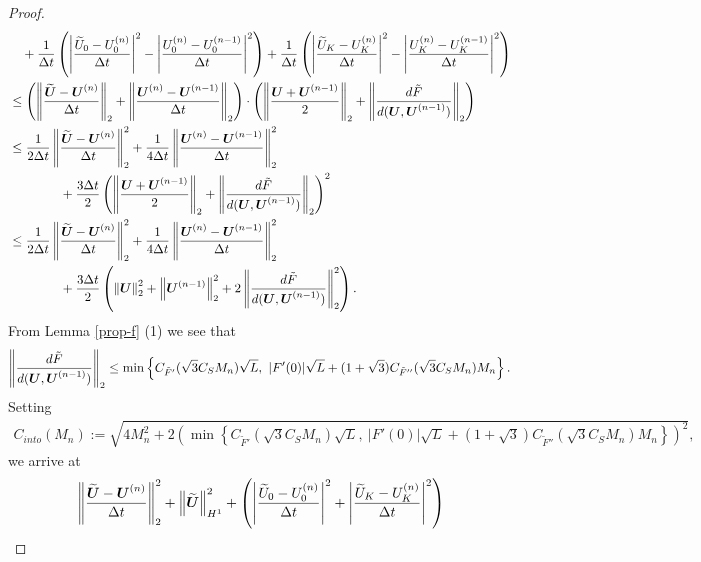 \documentclass[dvipdfmx-if-dvi,autodetect-engine,ja=standard]{amsart}
\numberwithin{equation}{section} %
\def\vect#1{\mbox{\boldmath $#1$}} %
\begin{document}
\begin{proof}
\begin{align*}
&\quad + \frac{1}{\Delta t}\left( \left| \frac{\widetilde{U}_0 - U_0^{(n)}}{\Delta t} \right|^2 - \left| \frac{U_0^{(n)} - U_0^{(n-1)}}{\Delta t} \right|^2 \right)
+ \frac{1}{\Delta t}\left( \left| \frac{\widetilde{U}_K - U_K^{(n)}}{\Delta t} \right|^2 - \left| \frac{U_K^{(n)} - U_K^{(n-1)}}{\Delta t} \right|^2 \right) \\
&\leq \left( \left\| \frac{\widetilde{\vect{U}} -\vect{U}^{(n)}}{\Delta t} \right\|_2 + \left\| \frac{\vect{U}^{(n)} -\vect{U}^{(n-1)}}{\Delta t} \right\|_2 \right) \cdot \left( \left\| \frac{\vect{U} + \vect{U}^{(n-1)}}{2} \right\|_2 + \left\|   \frac{d \tilde{F}}{d(\vect{U}, \vect{U}^{(n-1)})} \right\|_2 \right) \\
&\leq \frac{1}{2\Delta t} \left\| \frac{\widetilde{\vect{U}} -\vect{U}^{(n)}}{\Delta t} \right\|_2^2 
    + \frac{1}{4\Delta t} \left\| \frac{\vect{U}^{(n)} -\vect{U}^{(n-1)}}{\Delta t} \right\|_2^2 \\
&\qquad \qquad    + \frac{3 \Delta t}{2}\left( \left\| \frac{\vect{U} + \vect{U}^{(n-1)}}{2} \right\|_2 + \left\|   \frac{d \tilde{F}}{d(\vect{U}, \vect{U}^{(n-1)})} \right\|_2 \right)^2 \\
&\leq \frac{1}{2\Delta t} \left\| \frac{\widetilde{\vect{U}} -\vect{U}^{(n)}}{\Delta t} \right\|_2^2 
    + \frac{1}{4\Delta t} \left\| \frac{\vect{U}^{(n)} -\vect{U}^{(n-1)}}{\Delta t} \right\|_2^2 \\
&\qquad \qquad    + \frac{3 \Delta t}{2}\left( \left\| \vect{U}  \right\|_2^2 + \left\|  \vect{U}^{(n-1)} \right\|_2^2 + 2 \left\|  \frac{d \tilde{F}}{d(\vect{U}, \vect{U}^{(n-1)})} \right\|_2^2 \right).
\end{align*}
From Lemma \ref{prop-f} (1) we see that
\begin{align*}
\left\|  \frac{d \tilde{F}}{d(\vect{U}, \vect{U}^{(n-1)})} \right\|_2 \leq \min \left\{  C_{\tilde{F}'}(\sqrt{3} C_S M_n) \sqrt{L}, \  |F'(0)| \sqrt{L} + (1+\sqrt{3}) C_{\tilde{F}''}(\sqrt{3} C_S M_n) M_n \right\}. 
\end{align*}
Setting
\begin{align*}
C_{into}(M_n) := \sqrt{4 M_n^2 + 
2 \left(\min \left\{  C_{\tilde{F}'}(\sqrt{3} C_S M_n) \sqrt{L}, \  |F'(0)| \sqrt{L} + (1+\sqrt{3}) C_{\tilde{F}''}(\sqrt{3} C_S M_n) M_n \right\} \right)^2 },
\end{align*}
we arrive at  
\begin{align*}
&\left\| \frac{\widetilde{\vect{U}} -\vect{U}^{(n)}}{\Delta t} \right\|_2^2
+ \left\| \widetilde{\vect{U}} \right\|_{H^1}^2
 + \left( \left| \frac{\widetilde{U}_0 - U_0^{(n)}}{\Delta t} \right|^2 + \left| \frac{\widetilde{U}_K - U_K^{(n)}}{\Delta t} \right|^2  \right)  \\

\end{align*}
\end{proof}
\end{document}
